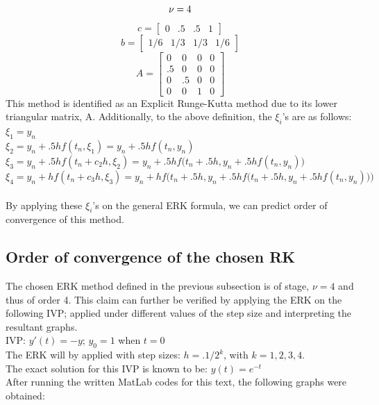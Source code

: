 \documentclass[a4paper]{article}
\begin{document}
\[ \nu = 4\\ \]
\[ c = \begin{bmatrix}
	0 & .5 & .5 & 1
\end{bmatrix} \]
\[ b = \begin{bmatrix}
	1/6 & 1/3 & 1/3 & 1/6
\end{bmatrix} \]
\[ A=
  \begin{bmatrix}
    0 & 0 & 0 & 0 \\ 
    .5 & 0 & 0 & 0 \\ 
    0 & .5 & 0 & 0 \\ 
    0 & 0 & 1 & 0
  \end{bmatrix} \]
This method is identified as an Explicit Runge-Kutta method due to its lower triangular matrix, A. Additionally, to the above definition, the $\xi_{i}$'s are as follows:\\
\indent$\xi_{1}=y_{n}$\\
\indent$\xi_{2}=y_{n}+.5hf(t_{n},\xi_{1})=y_{n}+.5hf(t_{n},y_{n})$\\
\indent$\xi_{3}=y_{n}+.5hf(t_{n}+c_{2}h,\xi_{2})=y_{n}+.5hf\Big(t_{n}+.5h,y_{n}+.5hf(t_{n},y_{n})\Big)$\\
\indent$\xi_{4}=y_{n}+hf(t_{n}+c_{3}h,\xi_{3})=y_{n}+hf\Big(t_{n}+.5h,y_{n}+.5hf\Big(t_{n}+.5h,y_{n}+.5hf(t_{n},y_{n})\Big)\Big)$\\\\
By applying these $\xi_{i}$'s on the general ERK formula, we can predict order of convergence of this method.


\subsection{Order of convergence of the chosen RK}
The chosen ERK method defined in the previous subsection is of stage, $\nu=4$ and thus of order 4. This claim can further be verified by applying the ERK on the following IVP; applied under different values of the step size and interpreting the resultant graphs.\\

IVP: \space $y'(t)=-y$; \space $y_{0}=1$ when $t=0$\\

The ERK will by applied with step sizes: $h=.1/2^k$, \space with $k=1,2,3,4. $ \\

The exact solution for this IVP is known to be: $y(t)=e^{-t}$ \\

After running the written MatLab codes for this text, the following graphs were obtained:
\end{document}
